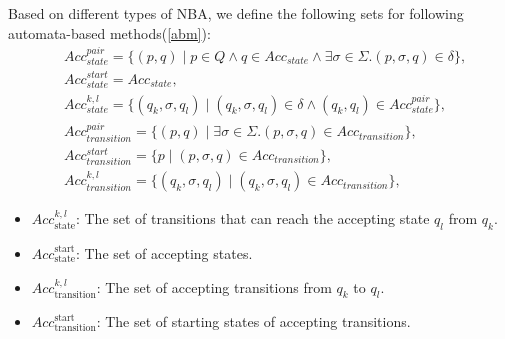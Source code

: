 \documentclass[acmlarge]{acmart}
\begin{document}
Based on different types of NBA, we define the following sets for following automata-based methods(\ref{abm}):
\begin{align}
  & Acc_{state}^{pair} = \{(p, q) \mid p \in Q \land q \in Acc_{state} \land \exists \sigma \in \Sigma. (p, \sigma, q) \in \delta \}, \label{aspair} \\
  & Acc_{state}^{start} = Acc_{state}, \label{asstart} \\
  & Acc_{state}^{k, l} = \{(q_k, \sigma, q_l) \mid (q_k, \sigma, q_l) \in \delta \land (q_k, q_l) \in Acc_{state}^{pair} \}, \label{askl} \\
  & Acc_{transition}^{pair} = \{(p, q) \mid \exists \sigma \in \Sigma. (p, \sigma, q) \in Acc_{transition} \}, \label{atpair}\\
  & Acc_{transition}^{start} = \{p \mid (p, \sigma, q) \in Acc_{transition} \}, \label{atstart}\\
  & Acc_{transition}^{k, l} = \{(q_k, \sigma, q_l) \mid (q_k, \sigma, q_l) \in Acc_{transition} \}, \label{atkl}
\end{align}
\begin{itemize}
    \item $\mathit{Acc}_{\text{state}}^{k,l}$: The set of transitions that can reach the accepting state $q_l$ from $q_k$.
    \item $\mathit{Acc}_{\text{state}}^{\text{start}}$: The set of accepting states.
    
    \item $\mathit{Acc}_{\text{transition}}^{k,l}$: The set of accepting transitions from $q_k$ to $q_l$.
    \item $\mathit{Acc}_{\text{transition}}^{\text{start}}$: The set of starting states of accepting transitions.
\end{itemize}

\end{document}
